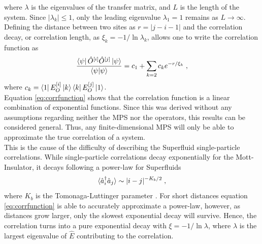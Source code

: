 where $\lambda$ is the eigenvalues of the transfer matrix, and $L$ is the length of the system. Since $|\lambda_k| \leq 1 $, only the leading eigenvalue $\lambda_1 = 1$ remains as $L \to \infty$. Defining the distance between two sites as $r = |j - i -1|$ and the correlation decay, or correlation length, as $\xi_k = -1/\ln \lambda_k$, allows one to write the correlation function as
\begin{equation}
	\frac{\bra{\psi} \hat{O}^{[i]} \hat{O}^{[j]} \ket{\psi}}{\braket{\psi | \psi}} = c_1 + \sum_{k = 2} c_k e^{-r/ \xi_k} \; , \label{eq:corrfunction}
\end{equation}
where $c_k = \bra{1} E_{O}^{[i]} \ket{k} \bra{k} E_{O}^{[j]} \ket{1}$. \cite{schollwock} \\
Equation \eqref{eq:corrfunction} shows that the correlation function is a linear combination of exponential functions. Since this was derived without any assumptions regarding neither the MPS nor the operators, this results can be considered general. Thus, any finite-dimensional MPS will only be able to approximate the true correlation of a system.\\
This is the cause of the difficulty of describing the Superfluid single-particle correlations. While single-particle correlations decay exponentially for the Mott-Insulator, it decays following a power-law for Superfluids
\begin{equation}
	\braket{\hat{a}_{i}^{\dag} \hat{a}_{j}} \sim |i - j|^{-K_b /2} \; ,
\end{equation}
where $K_b$ is the Tomonaga-Luttinger parameter \cite{characPhases}. For short distances equation \eqref{eq:corrfunction} is able to accurately approximate a power-law, however, as distances grow larger, only the slowest exponential decay will survive. Hence, the correlation turns into a pure exponential decay with $\xi = -1/ \ln \lambda$, where $\lambda$ is the largest eigenvalue of $\hat{E}$ contributing to the correlation.

